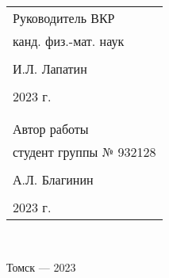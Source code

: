 \begin{flushright}\linespread{0.9}
	\normalsize{ 
		\begin{tabular}{@{}l@{}}
			Руководитель ВКР\\
			канд. физ.-мат. наук\\\\ \underline{\hspace{3.5cm}} И.Л. Лапатин\\\\
			\textquote{\underline{\hspace{1cm}}}\underline{\hspace{4cm}}2023 г.\\
			\break
			\\\\
			Автор работы\\
			студент группы № 932128\\\\ \underline{\hspace{3.5cm}} А.Л. Благинин\\\\
			\textquote{\underline{\hspace{1cm}}}\underline{\hspace{4cm}}2023 г.
		\end{tabular}	
	}\\
	
\end{flushright}
\hfill \break
\hfill \break
\begin{center} Томск --- 2023 \end{center}
\thispagestyle{empty} %
\clearpage
